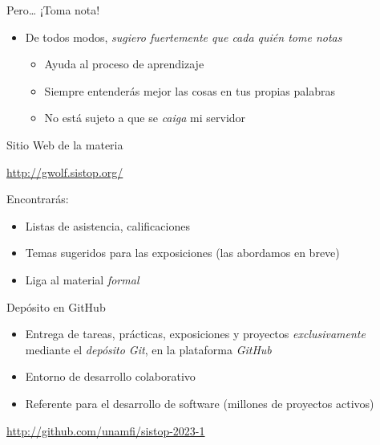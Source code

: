 \documentclass[presentation]{beamer}
\begin{document}
\begin{frame}[label={sec:org76f1c45}]{Pero\ldots{} ¡Toma nota!}
\begin{itemize}
\item De todos modos, \emph{sugiero fuertemente que cada quién tome notas}
\begin{itemize}
\item Ayuda al proceso de aprendizaje
\item Siempre entenderás mejor las cosas en tus propias palabras
\item No está sujeto a que se \emph{caiga} mi servidor
\end{itemize}
\end{itemize}
\end{frame}

\begin{frame}[label={sec:orgb2ee617}]{Sitio Web de la materia}
\begin{center}
\url{http://gwolf.sistop.org/}

Encontrarás:
\end{center}
\begin{itemize}
\item Listas de asistencia, calificaciones
\item Temas sugeridos para las exposiciones (las abordamos en breve)
\item Liga al material \emph{formal}
\end{itemize}
\end{frame}

\begin{frame}[label={sec:org53282de}]{Depósito en GitHub}
\begin{itemize}
\item Entrega de tareas, prácticas, exposiciones y proyectos
\emph{exclusivamente} mediante el \emph{depósito Git}, en la plataforma
\emph{GitHub}
\item Entorno de desarrollo colaborativo
\item Referente para el desarrollo de software (millones de proyectos activos)
\end{itemize}
\begin{center}
\url{http://github.com/unamfi/sistop-2023-1}
\end{center}
\end{frame}
\end{document}
